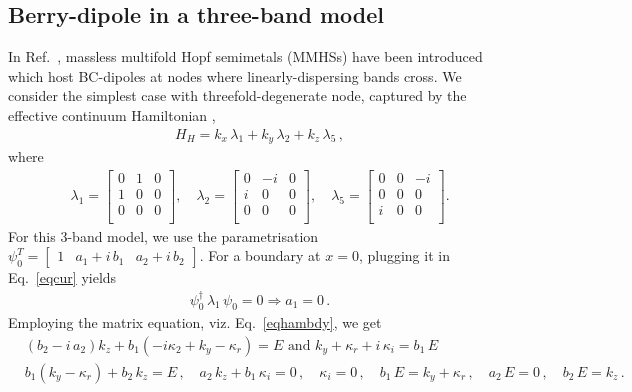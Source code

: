\documentclass[aps,prb,onecolumn, footinbib, 10pt]{revtex4-2}
\def \nn{\nonumber \\}
\begin{document}
\subsection{Berry-dipole in a three-band model}

In Ref.~\cite{graf-hopf}, massless multifold Hopf semimetals (MMHSs) have been introduced which host BC-dipoles at nodes where linearly-dispersing bands cross. We consider the simplest case with threefold-degenerate node, captured by the effective continuum Hamiltonian \cite{graf-hopf, hopf2, hopf3},
\begin{align}
\label{eqbcd2}
H_{H} = k_x \,\lambda_1 + k_y \,\lambda_2+ k_z\,\lambda_5\,,
\end{align}
where
\begin{align}
\lambda_1 =  \begin{bmatrix}
 0 & 1 & 0 \\
 1 & 0 & 0 \\
 0 & 0 & 0 \\
\end{bmatrix}, \quad
\lambda_2 = \begin{bmatrix}
 0 & -i & 0 \\
 i & 0 & 0 \\
 0 & 0 & 0 \\
\end{bmatrix}, \quad
\lambda_5 = \begin{bmatrix}
 0 & 0 & -i \\
 0 & 0 & 0 \\
 i & 0 & 0 \\
\end{bmatrix} .
\end{align}
For this 3-band model, we use the parametrisation $ \psi_0^T  = \begin{bmatrix}
1 & a_1 +i \, b_1 & a_2 + i\, b_2 \end{bmatrix}$. For a boundary at $x=0$, plugging it in Eq.~\eqref{eqcur} yields
\begin{align}
\psi_0^\dagger\, \lambda_1\, \psi_0 = 0 \Rightarrow a_1 = 0\,.
\end{align}
Employing the matrix equation, viz. Eq.~\eqref{eqhambdy}, we get
\begin{align}
& \left(b_2-i \,a_2\right) k_z+b_1 \left(-i \kappa_2+k_y-\kappa_r\right) = E 
\text{ and }
 k_y+\kappa_r + i \, \kappa_i = b_1 \, E \nn
& b_1 \left(k_y-\kappa_r\right)+b_2 \, k_z = E\,,\quad
a_2 \, k_z+b_1 \, \kappa_i = 0\,,\quad \kappa_i = 0 \,, \quad
b_1 \, E =  k_y+\kappa_r\,,\quad a_2\, E = 0\,,\quad b_2\, E = k_z\,.
\end{align}
\end{document}
